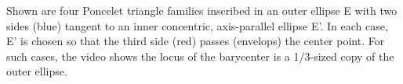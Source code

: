 Shown are four Poncelet triangle families inscribed in an outer ellipse E with two sides (blue) tangent to an inner concentric, axis-parallel ellipse E'. In each case, E' is chosen so that the third side (red) passes (envelops) the center point. For such cases, the video shows the locus of the barycenter is a 1/3-sized copy of the outer ellipse.